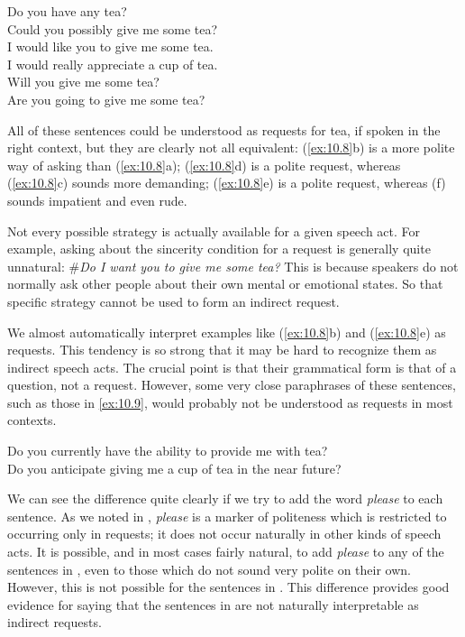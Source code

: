 \ea \label{ex:10.8}
\ea  Do you have any tea?\\
\ex Could you possibly give me some tea?\\
\ex I would like you to give me some tea.\\
\ex I would really appreciate a cup of tea.\\
\ex Will you give me some tea?\\
\ex Are you going to give me some tea?
                       \z
\z


All of these sentences could be understood as requests for tea, if spoken in the right context, but they are clearly not all equivalent: (\ref{ex:10.8}b) is a more polite way of asking than (\ref{ex:10.8}a); (\ref{ex:10.8}d) is a polite request, whereas (\ref{ex:10.8}c) sounds more demanding; (\ref{ex:10.8}e) is a polite request, whereas (f) sounds impatient and even rude.



Not every possible strategy is actually available for a given speech act. For example, asking about the sincerity condition for a request is generally quite unnatural: \#\textit{Do I want you to give me some tea?} This is because speakers do not normally ask other people about their own mental or emotional states. So that specific strategy cannot be used to form an indirect request.



We almost automatically interpret examples like (\ref{ex:10.8}b) and (\ref{ex:10.8}e) as requests. This tendency is so strong that it may be hard to recognize them as indirect speech acts. The crucial point is that their grammatical form is that of a question, not a request. However, some very close paraphrases of these sentences, such as those in \ref{ex:10.9}, would probably not be understood as requests in most contexts.


\ea \label{ex:10.9}
\ea  Do you currently have the ability to provide me with tea?\\
\ex Do you anticipate giving me a cup of tea in the near future?
                       \z
\z


We can see the difference quite clearly if we try to add the word \textit{please} to each sentence. As we noted in , \textit{please} is a marker of politeness which is restricted to occurring only in requests; it does not occur naturally in other kinds of speech acts. It is possible, and in most cases fairly natural, to add \textit{please} to any of the sentences in , even to those which do not sound very polite on their own. However, this is not possible for the sentences in . This difference provides good evidence for saying that the sentences in  are not naturally interpretable as indirect requests.



